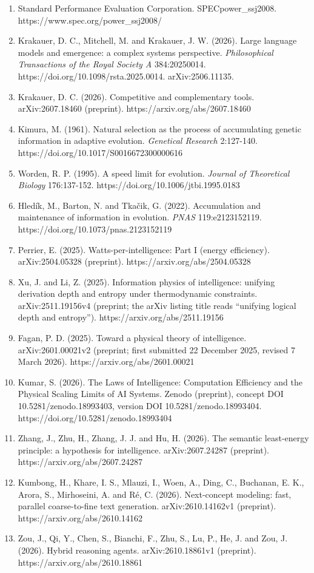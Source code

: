 \documentclass[
  10pt,
]{article}
\begin{document}
\begin{enumerate}
  Intelligence per Watt: measuring intelligence efficiency of local AI.
  arXiv:2511.07885 (preprint). https://arxiv.org/abs/2511.07885
\item
  Standard Performance Evaluation Corporation. SPECpower\_ssj2008.
  https://www.spec.org/power\_ssj2008/
\item
  Krakauer, D. C., Mitchell, M. and Krakauer, J. W. (2026). Large
  language models and emergence: a complex systems perspective.
  \emph{Philosophical Transactions of the Royal Society A} 384:20250014.
  https://doi.org/10.1098/rsta.2025.0014. arXiv:2506.11135.
\item
  Krakauer, D. C. (2026). Competitive and complementary tools.
  arXiv:2607.18460 (preprint). https://arxiv.org/abs/2607.18460
\item
  Kimura, M. (1961). Natural selection as the process of accumulating
  genetic information in adaptive evolution. \emph{Genetical Research}
  2:127-140. https://doi.org/10.1017/S0016672300000616
\item
  Worden, R. P. (1995). A speed limit for evolution. \emph{Journal of
  Theoretical Biology} 176:137-152.
  https://doi.org/10.1006/jtbi.1995.0183
\item
  Hledík, M., Barton, N. and Tkačik, G. (2022). Accumulation and
  maintenance of information in evolution. \emph{PNAS} 119:e2123152119.
  https://doi.org/10.1073/pnas.2123152119
\item
  Perrier, E. (2025). Watts-per-intelligence: Part I (energy
  efficiency). arXiv:2504.05328 (preprint).
  https://arxiv.org/abs/2504.05328
\item
  Xu, J. and Li, Z. (2025). Information physics of intelligence:
  unifying derivation depth and entropy under thermodynamic constraints.
  arXiv:2511.19156v4 (preprint; the arXiv listing title reads ``unifying
  logical depth and entropy''). https://arxiv.org/abs/2511.19156
\item
  Fagan, P. D. (2025). Toward a physical theory of intelligence.
  arXiv:2601.00021v2 (preprint; first submitted 22 December 2025,
  revised 7 March 2026). https://arxiv.org/abs/2601.00021
\item
  Kumar, S. (2026). The Laws of Intelligence: Computation Efficiency and
  the Physical Scaling Limits of AI Systems. Zenodo (preprint), concept
  DOI 10.5281/zenodo.18993403, version DOI 10.5281/zenodo.18993404.
  https://doi.org/10.5281/zenodo.18993404
\item
  Zhang, J., Zhu, H., Zhang, J. J. and Hu, H. (2026). The semantic
  least-energy principle: a hypothesis for intelligence.
  arXiv:2607.24287 (preprint). https://arxiv.org/abs/2607.24287
\item
  Kumbong, H., Khare, I. S., Mlauzi, I., Woen, A., Ding, C., Buchanan,
  E. K., Arora, S., Mirhoseini, A. and Ré, C. (2026). Next-concept
  modeling: fast, parallel coarse-to-fine text generation.
  arXiv:2610.14162v1 (preprint). https://arxiv.org/abs/2610.14162
\item
  Zou, J., Qi, Y., Chen, S., Bianchi, F., Zhu, S., Lu, P., He, J. and
  Zou, J. (2026). Hybrid reasoning agents. arXiv:2610.18861v1
  (preprint). https://arxiv.org/abs/2610.18861
\end{enumerate}
\end{document}
